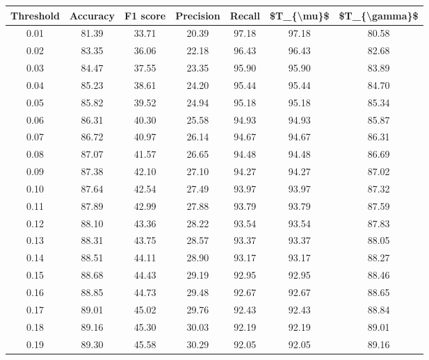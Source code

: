 \begin{tabular}{|c|c|c|c|c|c|c|}
\hline
 Threshold &  Accuracy &  F1 score &  Precision &  Recall &  \$T\_\{\textbackslash mu\}\$ &  \$T\_\{\textbackslash gamma\}\$ \\
\hline
      0.01 &     81.39 &     33.71 &      20.39 &   97.18 &      97.18 &         80.58 \\
      0.02 &     83.35 &     36.06 &      22.18 &   96.43 &      96.43 &         82.68 \\
      0.03 &     84.47 &     37.55 &      23.35 &   95.90 &      95.90 &         83.89 \\
      0.04 &     85.23 &     38.61 &      24.20 &   95.44 &      95.44 &         84.70 \\
      0.05 &     85.82 &     39.52 &      24.94 &   95.18 &      95.18 &         85.34 \\
      0.06 &     86.31 &     40.30 &      25.58 &   94.93 &      94.93 &         85.87 \\
      0.07 &     86.72 &     40.97 &      26.14 &   94.67 &      94.67 &         86.31 \\
      0.08 &     87.07 &     41.57 &      26.65 &   94.48 &      94.48 &         86.69 \\
      0.09 &     87.38 &     42.10 &      27.10 &   94.27 &      94.27 &         87.02 \\
      0.10 &     87.64 &     42.54 &      27.49 &   93.97 &      93.97 &         87.32 \\
      0.11 &     87.89 &     42.99 &      27.88 &   93.79 &      93.79 &         87.59 \\
      0.12 &     88.10 &     43.36 &      28.22 &   93.54 &      93.54 &         87.83 \\
      0.13 &     88.31 &     43.75 &      28.57 &   93.37 &      93.37 &         88.05 \\
      0.14 &     88.51 &     44.11 &      28.90 &   93.17 &      93.17 &         88.27 \\
      0.15 &     88.68 &     44.43 &      29.19 &   92.95 &      92.95 &         88.46 \\
      0.16 &     88.85 &     44.73 &      29.48 &   92.67 &      92.67 &         88.65 \\
      0.17 &     89.01 &     45.02 &      29.76 &   92.43 &      92.43 &         88.84 \\
      0.18 &     89.16 &     45.30 &      30.03 &   92.19 &      92.19 &         89.01 \\
      0.19 &     89.30 &     45.58 &      30.29 &   92.05 &      92.05 &         89.16 \\

\end{tabular}
